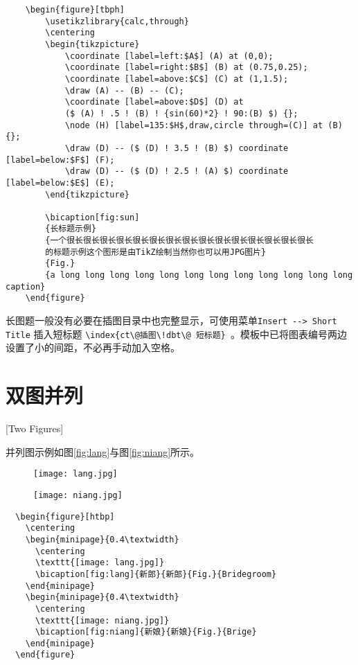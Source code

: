 \begin{lstlisting}
    \begin{figure}[tbph]
        \usetikzlibrary{calc,through}
        \centering
        \begin{tikzpicture}
            \coordinate [label=left:$A$] (A) at (0,0);
            \coordinate [label=right:$B$] (B) at (0.75,0.25);
            \coordinate [label=above:$C$] (C) at (1,1.5);
            \draw (A) -- (B) -- (C);
            \coordinate [label=above:$D$] (D) at
            ($ (A) ! .5 ! (B) ! {sin(60)*2} ! 90:(B) $) {};
            \node (H) [label=135:$H$,draw,circle through=(C)] at (B) {};
            \draw (D) -- ($ (D) ! 3.5 ! (B) $) coordinate [label=below:$F$] (F);
            \draw (D) -- ($ (D) ! 2.5 ! (A) $) coordinate [label=below:$E$] (E);
        \end{tikzpicture}

        \bicaption[fig:sun]
        {长标题示例}
        {一个很长很长很长很长很长很长很长很长很长很长很长很长很长很长很长
        的标题示例这个图形是由TikZ绘制当然你也可以用JPG图片}
        {Fig.}
        {a long long long long long long long long long long long long caption}
    \end{figure}
\end{lstlisting}

长图题一般没有必要在插图目录中也完整显示，可使用菜单\texttt{Insert -{}-\textgreater{} Short
Title} 插入短标题 \verb|\index{ct\@插图\!dbt\@ 短标题} |。模板中已将图表编号两边设置了小的间距，不必再手动加入空格。


\section{双图并列}[Two Figures]

并列图示例如图\ref{fig:lang}与图\ref{fig:niang}所示。

\begin{figure}[htbp]
  \centering
  \begin{minipage}{0.4\textwidth}
    \centering
    \texttt{[image: lang.jpg]}
  \end{minipage}
  \begin{minipage}{0.4\textwidth}
    \centering
    \texttt{[image: niang.jpg]}
  \end{minipage}
\end{figure}

\begin{lstlisting}
  \begin{figure}[htbp]
    \centering
    \begin{minipage}{0.4\textwidth}
      \centering
      \texttt{[image: lang.jpg]}
      \bicaption[fig:lang]{新郎}{新郎}{Fig.}{Bridegroom}
    \end{minipage}
    \begin{minipage}{0.4\textwidth}
      \centering
      \texttt{[image: niang.jpg]}
      \bicaption[fig:niang]{新娘}{新娘}{Fig.}{Brige}
    \end{minipage}
  \end{figure}
\end{lstlisting}

